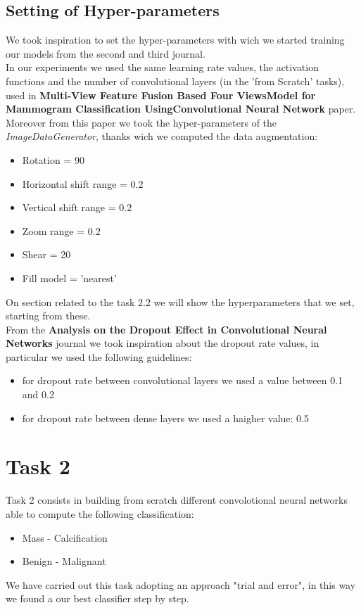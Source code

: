 \documentclass{article}
\begin{document}
\subsection{Setting of Hyper-parameters}
We took inspiration to set the hyper-parameters with wich we started training our models from the second and third journal.\\
In our experiments we used the same learning rate values, the activation functions and the number of convolutional layers (in the 'from Scratch' tasks), used in \textbf{Multi-View Feature Fusion Based Four ViewsModel for Mammogram Classification UsingConvolutional Neural Network} paper.\\
Moreover from this paper we took the hyper-parameters of the \textit{ImageDataGenerator}, thanks wich we computed the data augmentation:
\begin{itemize}
\item Rotation = 90
\item Horizontal shift range = 0.2
\item Vertical shift range = 0.2
\item Zoom range = 0.2
\item Shear = 20
\item Fill model = 'nearest' \\
\end{itemize}
On section related to the task 2.2 we will show the hyperparameters that we set, starting from these.\\
From the \textbf{Analysis on the Dropout Effect in Convolutional Neural Networks} journal we took inspiration about the dropout rate values, in particular we used the following guidelines:
\begin{itemize}
\item for dropout rate between convolutional layers we used a value between 0.1 and 0.2 
\item for dropout rate between dense layers we used a haigher value: 0.5\\
\end{itemize}



\clearpage
\section{Task 2}
Task 2 consists in building from scratch different convolotional neural networks able to compute the following classification:
\begin{itemize}
\item Mass - Calcification
\item Benign - Malignant
\end{itemize}
We have carried out this task adopting an approach "trial and error", in this way we found a our best classifier step by step.
\end{document}
